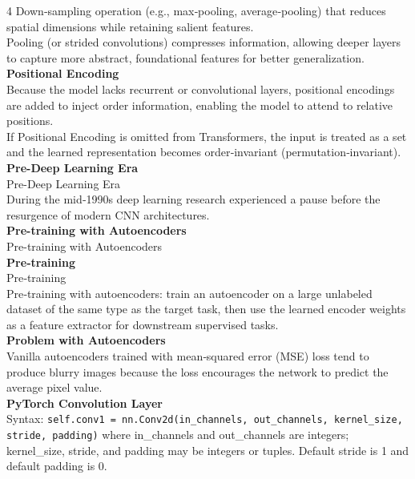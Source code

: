 \documentclass[8pt]{extarticle}
\begin{document}
\begin{multicols}{4}
Down‑sampling operation (e.g., max‑pooling, average‑pooling) that reduces spatial dimensions while retaining salient features.\\
Pooling (or strided convolutions) compresses information, allowing deeper layers to capture more abstract, foundational features for better generalization.\\
\vspace{2pt}\textbf{Positional Encoding}\\
Because the model lacks recurrent or convolutional layers, positional encodings are added to inject order information, enabling the model to attend to relative positions.\\
If Positional Encoding is omitted from Transformers, the input is treated as a set and the learned representation becomes order‑invariant (permutation‑invariant).\\
\vspace{2pt}\textbf{Pre-Deep Learning Era}\\
Pre-Deep Learning Era\\
During the mid‑1990s deep learning research experienced a pause before the resurgence of modern CNN architectures.\\
\vspace{2pt}\textbf{Pre-training with Autoencoders}\\
Pre-training with Autoencoders\\
\vspace{2pt}\textbf{Pre‑training}\\
Pre‑training\\
Pre‑training with autoencoders: train an autoencoder on a large unlabeled dataset of the same type as the target task, then use the learned encoder weights as a feature extractor for downstream supervised tasks.\\
\vspace{2pt}\textbf{Problem with Autoencoders}\\
Vanilla autoencoders trained with mean‑squared error (MSE) loss tend to produce blurry images because the loss encourages the network to predict the average pixel value.\\
\vspace{2pt}\textbf{PyTorch Convolution Layer}\\
Syntax: \texttt{self.conv1 = nn.Conv2d(in\_{}channels, out\_{}channels, kernel\_{}size, stride, padding)} where in\_{}channels and out\_{}channels are integers; kernel\_{}size, stride, and padding may be integers or tuples. Default stride is 1 and default padding is 0.\\

\end{multicols}
\end{document}
